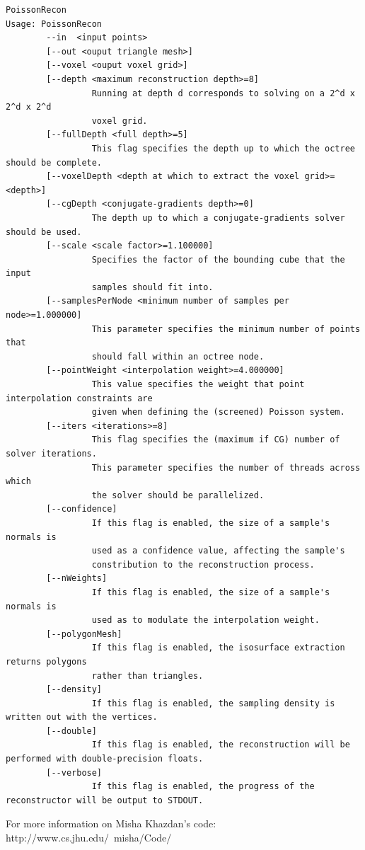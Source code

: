 \begin{verbatim}
PoissonRecon
Usage: PoissonRecon
        --in  <input points>
        [--out <ouput triangle mesh>]
        [--voxel <ouput voxel grid>]
        [--depth <maximum reconstruction depth>=8]
                 Running at depth d corresponds to solving on a 2^d x 2^d x 2^d
                 voxel grid.
        [--fullDepth <full depth>=5]
                 This flag specifies the depth up to which the octree should be complete.
        [--voxelDepth <depth at which to extract the voxel grid>=<depth>]
        [--cgDepth <conjugate-gradients depth>=0]
                 The depth up to which a conjugate-gradients solver should be used.
        [--scale <scale factor>=1.100000]
                 Specifies the factor of the bounding cube that the input
                 samples should fit into.
        [--samplesPerNode <minimum number of samples per node>=1.000000]
                 This parameter specifies the minimum number of points that
                 should fall within an octree node.
        [--pointWeight <interpolation weight>=4.000000]
                 This value specifies the weight that point interpolation constraints are
                 given when defining the (screened) Poisson system.
        [--iters <iterations>=8]
                 This flag specifies the (maximum if CG) number of solver iterations.
                 This parameter specifies the number of threads across which
                 the solver should be parallelized.
        [--confidence]
                 If this flag is enabled, the size of a sample's normals is
                 used as a confidence value, affecting the sample's
                 constribution to the reconstruction process.
        [--nWeights]
                 If this flag is enabled, the size of a sample's normals is
                 used as to modulate the interpolation weight.
        [--polygonMesh]
                 If this flag is enabled, the isosurface extraction returns polygons
                 rather than triangles.
        [--density]
                 If this flag is enabled, the sampling density is written out with the vertices.
        [--double]
                 If this flag is enabled, the reconstruction will be performed with double-precision floats.
        [--verbose]
                 If this flag is enabled, the progress of the reconstructor will be output to STDOUT.
\end{verbatim}
For more information on Misha Khazdan's code: http://www.cs.jhu.edu/~misha/Code/


